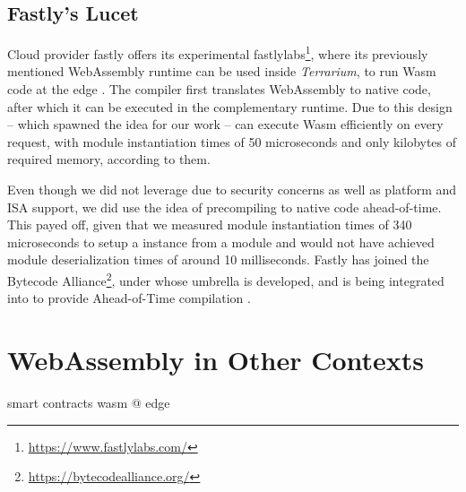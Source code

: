 
\subsection{Fastly's Lucet}

Cloud provider fastly offers its experimental fastlylabs\footnote{\url{https://www.fastlylabs.com/}}, where its previously mentioned  WebAssembly runtime can be used inside \emph{Terrarium}, to run Wasm code at the edge \cite{fastly2019}. The  compiler first translates WebAssembly to native code, after which it can be executed in the complementary runtime. Due to this design -- which spawned the idea for our work --  can execute Wasm efficiently on every request, with module instantiation times of 50 microseconds and only kilobytes of required memory, according to them.

Even though we did not leverage  due to security concerns as well as platform and ISA support, we did use the idea of precompiling to native code ahead-of-time. This payed off, given that we measured module instantiation times of 340 microseconds to setup a  instance from a module and would not have achieved module deserialization times of around 10 milliseconds.
Fastly has joined the Bytecode Alliance\footnote{\url{https://bytecodealliance.org/}}, under whose umbrella  is developed, and  is being integrated into  to provide Ahead-of-Time compilation \cite{Hickey2020}.

\section{WebAssembly in Other Contexts}

smart contracts
wasm @ edge
